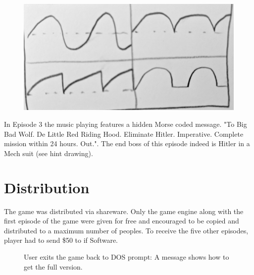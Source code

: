 \documentclass[book.tex]{subfiles}
\begin{document}
\par
\begin{figure}[H]
\centering
 \includegraphics[width=\textwidth]{imgs/drawings/wave.png}
\end{figure}


 In Episode 3 the music playing features a hidden Morse coded message. "To Big Bad Wolf. De Little Red Riding Hood. Eliminate Hitler. Imperative. Complete mission within 24 hours. Out.". The end boss of this episode indeed is Hitler in a Mech suit (see hint drawing).




























\section{Distribution}
The game was distributed via shareware. Only the game engine along with the first episode of the game were given for free and encouraged to be copied and distributed to a maximum number of peoples. To receive the five other episodes, player had to send \$50 to if Software.\\
\par
\begin{figure}[H]
\centering
 \caption{User exits the game back to DOS prompt: A message shows how to get the full version.}
 \end{figure}
\end{document}
